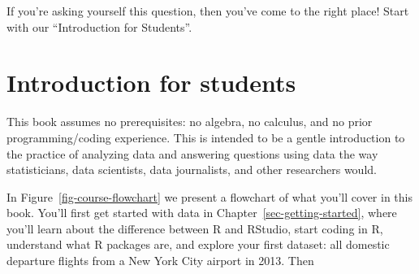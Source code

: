 \documentclass[
  letterpaper,
  DIV=11,
  numbers=noendperiod]{scrreprt}
\theoremstyle{definition}
\theoremstyle{remark}
\begin{document}
If you're asking yourself this question, then you've come to the right
place! Start with our ``Introduction for Students''.

\hypertarget{introduction-for-students}{%
\section*{Introduction for students}\label{introduction-for-students}}


This book assumes no prerequisites: no algebra, no calculus, and no
prior programming/coding experience. This is intended to be a gentle
introduction to the practice of analyzing data and answering questions
using data the way statisticians, data scientists, data journalists, and
other researchers would.

In Figure~\ref{fig-course-flowchart} we present a flowchart of what
you'll cover in this book. You'll first get started with data in
Chapter~\ref{sec-getting-started}, where you'll learn about the
difference between R and RStudio, start coding in R, understand what R
packages are, and explore your first dataset: all domestic departure
flights from a New York City airport in 2013. Then
\end{document}
